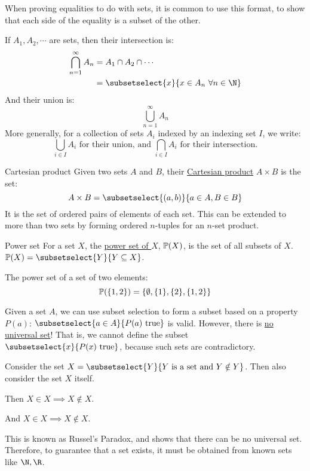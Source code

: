 \documentclass[../Main.tex]{subfiles}
\begin{document}
\begin{remark}
    When proving equalities to do with sets, it is common to use this format, to show that each side of the equality is a subset of the other.
\end{remark}
If $A_1, A_2, \cdots$ are sets, then their intersection is:
\begin{align*}
    \bigcap_{n=1}^\infty A_n &= A_1 \cap A_2 \cap \cdots \\
    &= \subsetselect{x}{x \in A_n~\forall n \in \N}
\end{align*}
And their union is:
\begin{equation*}
    \bigcup_{n=1}^\infty A_n
\end{equation*}
More generally, for a collection of sets $A_i$ indexed by an indexing set $I$, we write:
\begin{equation*}
    \bigcup_{i \in I} A_i \text{ for their union, and }
    \bigcap_{i \in I} A_i \text{ for their intersection.}
\end{equation*}
\begin{definition}{Cartesian product}
    Given two sets $A$ and $B$, their \underline{Cartesian product} $A \times B$ is the set:
    \begin{equation*}
        A \times B = \subsetselect{(a, b)}{a \in A, B \in B}
    \end{equation*}
    It is the set of ordered pairs of elements of each set. This can be extended to more than two sets by forming ordered $n$-tuples for an $n$-set product.
\end{definition}
\begin{definition}{Power set}
    For a set $X$, the \underline{power set of $X$}, $\mathbb{P}(X)$, is the set of all subsets of $X$. $\powerset{X} = \subsetselect{Y}{Y \subseteq X}$.
\end{definition}
\begin{example}
    The power set of a set of two elements:
    \begin{equation*}
        \mathbb{P}(\{1, 2\}) = \{\emptyset, \{1\}, \{2\}, \{1, 2\}\}
    \end{equation*}
\end{example}
\begin{warning}
    Given a set $A$, we can use subset selection to form a subset based on a property $P(a)$: $\subsetselect{a \in A}{P(a) \text{ true}}$ is valid. However, there is \underline{no universal set}! That is, we cannot define the subset $\subsetselect{x}{P(x) \text{ true}}$, because such sets are contradictory.\par
    Consider the set $X = \subsetselect{Y}{Y \text{ is a set and } Y \notin Y}$. Then also consider the set $X$ itself.\par
    Then $X \in X \implies X \notin X$.\par
    And $X \in X \implies X \notin X$.\contradiction\par
    This is known as Russel's Paradox, and shows that there can be no universal set. Therefore, to guarantee that a set exists, it must be obtained from known sets like $\N, \R$.
\end{warning}
\end{document}
